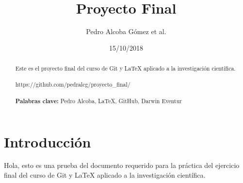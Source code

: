 \documentclass[a4paper,11pt]{article}
\begin{document}
\title{Proyecto Final}
\author{Pedro Alcoba Gómez et al.}
\date{15/10/2018}
\begin{abstract}
	Este es el proyecto final del curso de Git y \LaTeX{} aplicado a la investigación científica.\\\\https://github.com/pedralcg/proyecto\_final/ \\\\
\textbf{Palabras clave:} Pedro Alcoba, \LaTeX{}, GitHub, Darwin Eventur  
\end{abstract}
\tableofcontents
\maketitle
\part{Introducción}
Hola, esto es una prueba del documento requerido para la práctica del ejercicio final del curso de Git y \LaTeX{} aplicado a la investigación científica.
\end{document}
